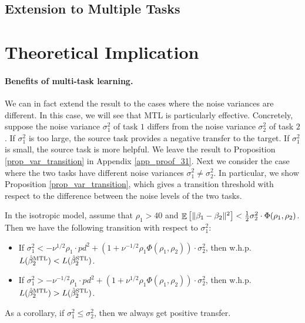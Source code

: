 \subsection{Extension to Multiple Tasks}




\section{Theoretical Implication}


\paragraph{Benefits of multi-task learning.}
We can in fact extend the result to the cases where the noise variances are different.
In this case, we will see that MTL is particularly effective.
Concretely, suppose the noise variance $\sigma_1^2$ of task $1$ differs from the noise variance $\sigma_2^2$ of task $2$.
If $\sigma_1^2$ is too large, the source task provides a negative transfer to the target.
If $\sigma_1^2$ is small, the source task is more helpful.
We leave the result to Proposition \ref{prop_var_transition} in Appendix \ref{app_proof_31}.
Next we consider the case where the two tasks have different noise variances $\sigma_1^2\ne \sigma_2^2$. In particular, we show Proposition \ref{prop_var_transition}, which gives a transition threshold with respect to the difference between the noise levels of the two tasks.

\begin{proposition}
\label{prop_var_transition}
	In the isotropic model, assume that $\rho_1 > 40$ and $\mathop{\mathbb{E}}\left[ \|\beta_1 - \beta_2\|^2 \right]< \frac{1}{2} {\sigma_2^2}  \cdot \Phi(\rho_1, \rho_2)$.
	Then we have the following transition with respect to $\sigma_1^2$:
	\begin{itemize}
		\item If $\sigma_1^2 < - \nu^{1/2} \rho_1 \cdot p d^2+\left(1+ \nu^{-1/2}\rho_1 \Phi(\rho_1, \rho_2)\right)\cdot\sigma_2^2$, then w.h.p. $L(\hat{\beta}_2^{\textup{MTL}}) < L(\hat{\beta}_2^{\textup{STL}})$.
		\item If $\sigma_1^2 > -\nu^{-1/2}\rho_1\cdot p d^2   +\left(1+ \nu^{1/2}\rho_1\Phi(\rho_1, \rho_2)\right) \cdot \sigma_2^2$, then w.h.p. $L(\hat{\beta}_2^{\textup{MTL}}) > L(\hat{\beta}_2^{\textup{STL}})$.
	\end{itemize}
\end{proposition}
As a corollary, if $\sigma_1^2 \le \sigma_2^2$, then we always get positive transfer.






